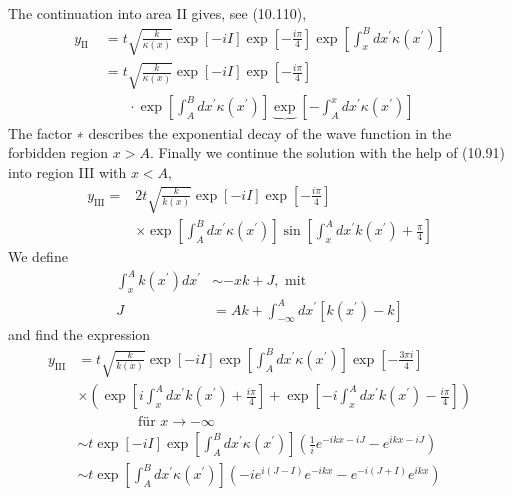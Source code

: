 The continuation into area II gives, see (10.110),
\begin{equation}
\begin{aligned} y_{\mathrm{II}} &\;=t \sqrt{\frac{k}{\kappa(x)}} \exp [-i I] \exp \left[-\frac{i \pi}{4}\right] \exp \left[\int_{x}^{B} d x^{\prime} \kappa\left(x^{\prime}\right)\right] \\ \;&\;=t \sqrt{\frac{k}{\kappa(x)}} \exp [-i I] \exp \left[-\frac{i \pi}{4}\right] \\ & \qquad \cdot \exp \left[\int_{A}^{B} d x^{\prime} \kappa\left(x^{\prime}\right)\right] \underbrace{\exp }\left[-\int_{A}^{x} d x^{\prime} \kappa\left(x^{\prime}\right)\right]
\end{aligned}
\end{equation}
The factor ∗ describes the exponential decay of the wave function in the forbidden region $x> A$. Finally we continue the solution with the help of (10.91) into region III with $x <A,$
\begin{equation}
\begin{aligned} y_{\mathrm{III}}=& 2 t \sqrt{\frac{k}{k(x)}} \exp [-i I] \exp \left[-\frac{i \pi}{4}\right] \\ & \times \exp \left[\int_{A}^{B} d x^{\prime} \kappa\left(x^{\prime}\right)\right] \sin \left[\int_{x}^{A} d x^{\prime} k\left(x^{\prime}\right)+\frac{\pi}{4}\right] \end{aligned}
\end{equation}
We define
\begin{equation}
\begin{aligned} \int_{x}^{A} k\left(x^{\prime}\right) d x^{\prime} & \sim-x k+J, \text { mit } \\ J &=A k+\int_{-\infty}^{A} d x^{\prime}\left[k\left(x^{\prime}\right)-k\right] \end{aligned}
\end{equation}
and find the expression
\begin{equation}
\begin{aligned} y_{\mathrm{III}} &=t \sqrt{\frac{k}{k(x)}} \exp [-i I] \exp \left[\int_{A}^{B} d x^{\prime} \kappa\left(x^{\prime}\right)\right] \exp \left[-\frac{3 \pi i}{4}\right] \\ & \times\left(\exp \left[i \int_{x}^{A} d x^{\prime} k\left(x^{\prime}\right)+\frac{i \pi}{4}\right]+\exp \left[-i \int_{x}^{A} d x^{\prime} k\left(x^{\prime}\right)-\frac{i \pi}{4}\right]\right) \\ & \quad \quad \quad \quad \text { für } x \rightarrow-\infty \\ & \sim t \exp [-i I] \exp \left[\int_{A}^{B} d x^{\prime} \kappa\left(x^{\prime}\right)\right]\left(\frac{1}{i} e^{-i k x-i J}-e^{i k x-i J}\right) \\ & \sim t \exp \left[\int_{A}^{B} d x^{\prime} \kappa\left(x^{\prime}\right)\right]\left(-i e^{i(J-I)} e^{-i k x}-e^{-i(J+I)} e^{i k x}\right) \end{aligned}
\end{equation}
